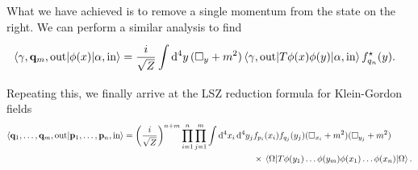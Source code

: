 What we have achieved is to remove a single momentum from the state on the right. We can perform a similar analysis to find
\begin{align*}
	\mel{\gamma, \vb{q}_{m}, \text{out}}{\phi(x)}{\alpha, \text{in}} &= \frac{i}{\sqrt{Z}}\int\limits_{}^{}\dd[4]{y}(\square _{y} + m^{2})\mel{\gamma, \text{out}}{\ensuremath{T}{\phi(x)}{\phi(y)}}{\alpha, \text{in}}f_{q_{n}}^{\star}(y).
\end{align*}
Repeating this, we finally arrive at the LSZ reduction formula for Klein-Gordon fields
\begin{align*}
	\braket{\vb{q}_{1}, \dots, \vb{q}_{m}, \text{out}}{\vb{p}_{1}, \dots, \vb{p}_{n}, \text{in}} = \left(\frac{i}{\sqrt{Z}}\right)^{n + m}\prod\limits_{i = 1}^{n}\prod\limits_{j = 1}^{m}\int\dd[4]{x_{i}}\dd[4]{y_{j}}&f_{p_{i}}(x_{i})f_{q_{j}}(y_{j})(\square _{x_{i}} + m^{2})(\square _{y_{j}} + m^{2}) \\
	&\times\expval{\ensuremath{T}{\phi(y_{1})\dots\phi(y_{m})}{\phi(x_{1})\dots\phi(x_{n})}}{\Omega}.
\end{align*}


